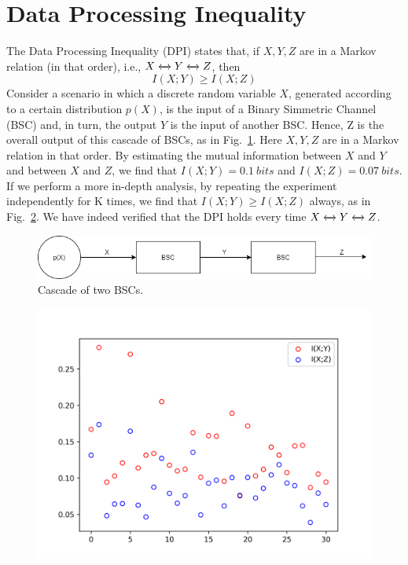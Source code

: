 \documentclass[a4paper]{article}
\begin{document}
	\section{Data Processing Inequality}
	The Data Processing Inequality (DPI) states that, if $ X,Y,Z $ are in a Markov relation (in that order), i.e., $ X \xleftrightarrow{} Y \xleftrightarrow{} Z $, then
	\begin{equation}
		I(X;Y) \ge I(X;Z)
	\end{equation}
	Consider a scenario in which a discrete random variable $ X $, generated according to a certain distribution $ p(X) $, is the input of a Binary Simmetric Channel (BSC) and, in turn, the output $ Y $ is the input of another BSC. Hence, Z is the overall output of this cascade of BSCs, as in Fig.~\ref{fig:bsc_cascade}. Here $ X,Y,Z $ are in a Markov relation in that order. By estimating the mutual information between $ X $ and $ Y $ and between $ X $ and $ Z $, we find that $ I(X;Y) = 0.1\ bits $ and $ I(X;Z) = 0.07\ bits $. If we perform a more in-depth analysis, by repeating the experiment independently for K times, we find that $ I(X;Y) \ge I(X;Z) $ always, as in Fig.~\ref{fig:mi_bsc_cascade}. We have indeed verified that the DPI holds every time $ X \xleftrightarrow{} Y \xleftrightarrow{} Z $.
	\begin{figure}[!h]
		\centering
		\includegraphics[width=0.7\linewidth]{bsc_cascade.png}
		\caption{Cascade of two BSCs.}
		\label{fig:bsc_cascade}
	\end{figure}
	\begin{figure}[!h]
		\centering
		\includegraphics[width=0.7\linewidth]{mi.png}
		\caption{}
		\label{fig:mi_bsc_cascade}
	\end{figure}
\end{document}
